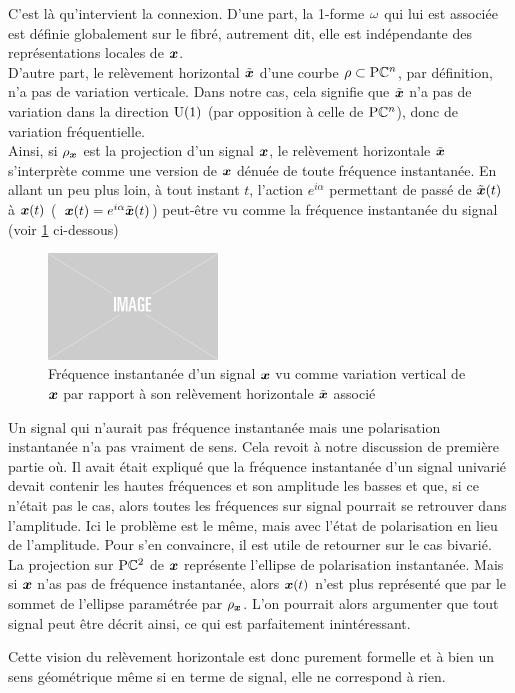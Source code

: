 C'est là qu'intervient la connexion. D'une part, la 1-forme $\omega$ qui lui est associée est définie globalement sur le fibré, autrement dit, elle est indépendante des représentations locales de $\boldsymbol{x}$.
\\
D'autre part, le relèvement horizontal $\Tilde{\boldsymbol{x}}$ d'une courbe $\rho\subset\text{\normalfont P}\mathbb{C}^{n}$, par définition, n'a pas de variation verticale. Dans notre cas, cela signifie que $\Tilde{\boldsymbol{x}}$ n'a pas de variation dans la direction $\text{\normalfont U}(1)$ (par opposition à celle de $\text{\normalfont P}\mathbb{C}^{n}$), donc de variation fréquentielle.
\\
Ainsi, si $\rho_{\boldsymbol{x}}$ est la projection d'un signal $\boldsymbol{x}$, le relèvement horizontale $\Tilde{\boldsymbol{x}}$ s'interprète comme une version de $\boldsymbol{x}$ dénuée de toute fréquence instantanée.
En allant un peu plus loin, à tout instant $t$, l'action $e^{i\alpha}$ permettant de passé de $\Tilde{\boldsymbol{x}}(t)$ à $\boldsymbol{x}(t)$ (\ie~$\boldsymbol{x}(t) = e^{i\alpha} \Tilde{\boldsymbol{x}}(t)$) peut-être vu comme la fréquence instantanée du signal (voir \cref{fig:freq_inst_geodiff} ci-dessous)

\begin{figure}[h]
	\includegraphics[width=0.4\textwidth]{fig/placeholder}
	\caption[Interprétation géométrique de la fréquence instantanée]{Fréquence instantanée d'un signal $\boldsymbol{x}$ vu comme variation vertical de $\boldsymbol{x}$ par rapport à son relèvement horizontale $\Tilde{\boldsymbol{x}}$ associé}
	\label{fig:freq_inst_geodiff}
\end{figure}	

\begin{remarque}
	Un signal qui n'aurait pas fréquence instantanée mais une polarisation instantanée n'a pas vraiment de sens. 
	Cela revoit à notre discussion de première partie où. Il avait était expliqué que la fréquence instantanée d'un signal univarié devait contenir les hautes fréquences et son amplitude les basses et que, si ce n'était pas le cas, alors toutes les fréquences sur signal pourrait se retrouver dans l'amplitude.
	Ici le problème est le même, mais avec l'état de polarisation en lieu de l’amplitude. Pour s'en convaincre, il est utile de retourner sur le cas bivarié.
	\\
	La projection sur $\text{\normalfont P}\mathbb{C}^{2}$ de $\boldsymbol{x}$ représente l'ellipse de polarisation instantanée. 
	Mais si $\boldsymbol{x}$ n'as pas de fréquence instantanée, alors $\boldsymbol{x}(t)$ n'est plus représenté que par le sommet de l’ellipse paramétrée par $\rho_{\boldsymbol{x}}$. 
	L'on pourrait alors argumenter que tout signal peut être décrit ainsi, ce qui est parfaitement inintéressant.
	
	Cette vision du relèvement horizontale est donc purement formelle et à bien un sens géométrique même si en terme de signal, elle ne correspond à rien.
\end{remarque}
\skipl

